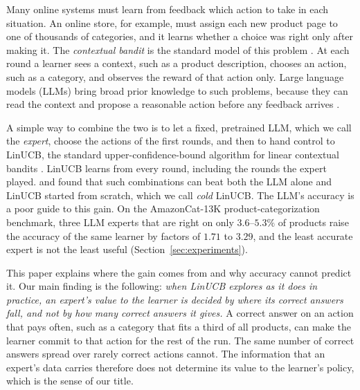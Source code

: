 \documentclass[anon]{alt2027} %
\newif\ifrevmarks\revmarkstrue
\newenvironment{revised}{\ifrevmarks\color{revcolor}\fi}{}
\begin{document}
\begin{revised}
Many online systems must learn from feedback which action to take in each
situation. An online store, for example, must assign each new product page
to one of thousands of categories, and it learns whether a choice was right
only after making it. The \emph{contextual bandit} is the standard model of
this problem \citep{lattimore2020bandit}. At each round a learner sees a
context, such as a product description, chooses an action, such as a
category, and observes the reward of that action only. Large language
models (LLMs) bring broad prior knowledge to such problems, because they can
read the context and propose a reasonable action before any feedback
arrives \citep{brown2020language,ouyang2022training,achiam2023gpt}.

A simple way to combine the two is to let a fixed, pretrained LLM, which we
call the \emph{expert}, choose the actions of the first rounds, and then to
hand control to LinUCB, the standard upper-confidence-bound algorithm for
linear contextual bandits \citep{li2010contextual,chu2011contextual}.
LinUCB learns from every round, including the rounds the expert played.
\citet{chen2024llmdecision} and \citet{huangcontextual} found that such
combinations can beat both the LLM alone and LinUCB started from scratch,
which we call \emph{cold} LinUCB. The LLM's accuracy is a poor guide to this
gain. On the AmazonCat-13K product-categorization benchmark, three LLM
experts that are right on only $3.6$--$5.3\%$ of products raise the accuracy
of the same learner by factors of $1.71$ to $3.29$, and the least accurate
expert is not the least useful (Section~\ref{sec:experiments}).

This paper explains where the gain comes from and why accuracy cannot
predict it. Our main finding is the following: \emph{when LinUCB explores as
it does in practice, an expert's value to the learner is decided by where
its correct answers fall, and not by how many correct answers it gives.} A
correct answer on an action that pays often, such as a category that fits a
third of all products, can make the learner commit to that action for the
rest of the run. The same number of correct answers spread over rarely
correct actions cannot. The information that an expert's data carries
therefore does not determine its value to the learner's policy, which is
the sense of our title.
\end{revised}
\end{document}
